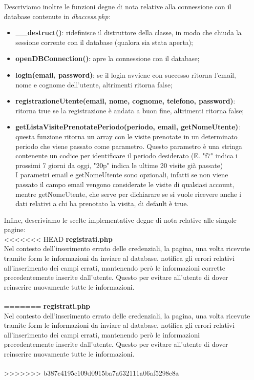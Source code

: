 Descriviamo inoltre le funzioni degne di nota relative alla connessione con il database contenute in \textit{dbaccess.php}:
\begin{itemize}
\item \textbf{\_\_destruct()}: ridefinisce il distruttore della classe, in modo che chiuda la sessione corrente con il database (qualora sia stata aperta);
\item \textbf{openDBConnection()}: apre la connessione con il database;
\item \textbf{login(email, password)}: se il login avviene con successo ritorna l'email, nome e cognome dell'utente, altrimenti ritorna false;
\item \textbf{registrazioneUtente(email, nome, cognome, telefono, password)}: ritorna true se la registrazione è andata a buon fine, altrimenti ritorna false;
\item \textbf{getListaVisitePrenotatePeriodo(periodo, email, getNomeUtente)}: questa funzione ritorna un array con le visite prenotate in un determinato periodo che viene passato come parametro. Questo parametro è una stringa contenente un codice per identificare il periodo desiderato (E. "f7" indica i prossimi 7 giorni da oggi, "20p" indica le ultime 20 visite già passate) \\I parametri email e getNomeUtente sono opzionali, infatti se non viene passato il campo email vengono considerate le visite di qualsiasi account, mentre getNomeUtente, che serve per dichiarare se si vuole ricevere anche i dati relativi a chi ha prenotato la visita, di default è true.
\end{itemize}

\pagebreak

Infine, descriviamo le scelte implementative degne di nota relative alle singole pagine: \\

<<<<<<< HEAD
\textbf{registrati.php} \\ 
Nel contesto dell'inserimento errato delle credenziali, la pagina, una volta ricevute tramite form le informazioni da inviare al database, notifica gli errori relativi all'inserimento dei campi errati, mantenendo però le informazioni corrette precedentemente inserite dall'utente. Questo per evitare all'utente di dover reinserire nuovamente tutte le informazioni. \\ \\
=======
\textbf{registrati.php} \\
Nel contesto dell'inserimento errato delle credenziali, la pagina, una volta ricevute tramite form le informazioni da inviare al database, notifica gli errori relativi all'inserimento dei campi errati, mantenendo però le informazioni precedentemente inserite dall'utente. Questo per evitare all'utente di dover reinserire nuovamente tutte le informazioni. \\ \\
>>>>>>> b387c4195c109d0915ba7a632111a06af5298e8a

